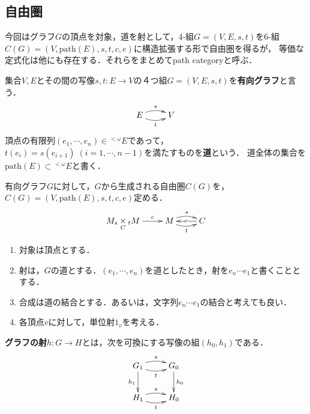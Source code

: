 \documentclass[uplatex, dvipdfmx]{jsreport}
\begin{document}
\subsection{自由圏}

今回はグラフ$G$の頂点を対象，道を射として，4-組$G=(V,E,s,t)$を6-組$C(G)=(V,\mathrm{path}(E),s,t,c,e)$に構造拡張する形で自由圏を得るが，
等価な定式化は他にも存在する．それらをまとめてpath categoryと呼ぶ．

\begin{definition}
    集合$V,E$とその間の写像$s,t:E\to V$の４つ組$G=(V,E,s,t)$を\textbf{有向グラフ}と言う．
    \[\xymatrix{
        E\ar@/^/[r]^-s\ar@/_/[r]_-t&V
    }\]
    頂点の有限列$(e_1,\cdots,e_n)\in {}^{<\omega}\! E$であって，$t(e_i)=s(e_{i+1})\; (i=1,\cdots,n-1)$を満たすものを\textbf{道}という．
    道全体の集合を$\mathrm{path}(E)\subset{}^{<\omega}\! E$と書く．
\end{definition}

\begin{definition}
    有向グラフ$G$に対して，$G$から生成される自由圏$C(G)$を，$C(G)=(V,\mathrm{path}(E),s,t,c,e)$定める．
    \[\xymatrix{
        {M_s\underset{C}{\times}{}_tM}\ar[r]^-c&M\ar@/^/[r]^-{s}\ar@/_/[r]_-{t}&C\ar[l]|e
    }\]
    \begin{enumerate}
        \item 対象は頂点とする．
        \item 射は，$G$の道とする．$(e_1, \cdots, e_n)$を道としたとき，射を$e_n\cdots e_1$と書くこととする．
        \item 合成は道の結合とする．あるいは，文字列$e_n\cdots e_1$の結合と考えても良い．
        \item 各頂点$v$に対して，単位射$1_v$を考える．
    \end{enumerate}
\end{definition}

\begin{definition}
    \textbf{グラフの射}$h:G\to H$とは，次を可換にする写像の組$(h_0, h_1)$である．
    \[\xymatrix{
        G_1\ar@/^/[r]^-s\ar@/_/[r]_-t\ar[d]_-{h_1}&G_0\ar[d]^{h_0}\\
        H_1\ar@/^/[r]^-s\ar@/_/[r]_-t&H_0
    }\]
\end{definition}
\end{document}

